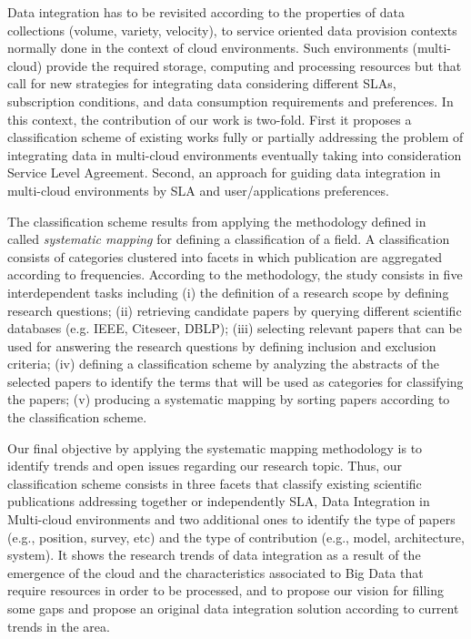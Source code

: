 Data integration has to be revisited according to  the properties of data collections (volume, variety, velocity), to service oriented data provision contexts normally done in the context of cloud environments. Such environments (multi-cloud)  provide the required storage, computing and processing resources but that call for new strategies for integrating data considering different SLAs, subscription conditions, and data consumption requirements and preferences. In this context, the contribution of our work is two-fold. First it proposes a classification scheme of existing works fully or partially addressing the problem of integrating data in multi-cloud environments eventually taking into consideration Service Level Agreement. Second, an approach for guiding data integration in multi-cloud environments  by SLA and user/applications preferences. 

The classification scheme results from  applying the  methodology defined in~\cite{SM:Petersen:2008} called  \textit{systematic mapping}  for defining a classification of a field. A classification consists of categories clustered into facets in which publication are aggregated according to frequencies. According to the methodology, the study consists in  five interdependent tasks including (i) the definition of a research scope by defining research questions; (ii) retrieving candidate papers by querying different scientific databases (e.g. IEEE, Citeseer, DBLP); (iii) selecting relevant papers that can be used for answering the research questions by defining inclusion and exclusion criteria; (iv) defining a classification scheme by analyzing the abstracts of the selected papers to identify the terms that will be used as categories for classifying the papers; (v) producing a systematic mapping by sorting papers according to the classification scheme. 

Our final objective by applying the systematic mapping methodology is to identify trends and open issues regarding our research topic. Thus, our classification scheme consists in three facets that classify existing scientific publications addressing  together or independently SLA, Data Integration in Multi-cloud environments and two additional ones to identify the type of papers (e.g., position, survey, etc) and the type of contribution (e.g., model, architecture, system). It shows the research trends of data integration as a result of the emergence of the cloud and the characteristics associated to Big Data that require resources in order to be processed,  and to propose our vision for filling some gaps and propose an original data integration solution according to current trends in the area. 


